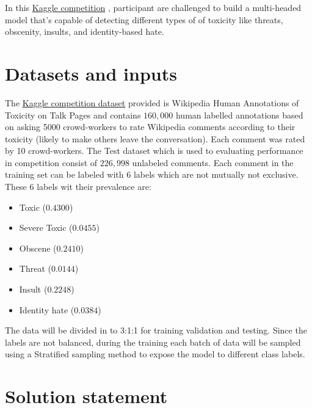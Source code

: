 \documentclass{article}
\begin{document}
In this \href{https://www.kaggle.com/c/jigsaw-toxic-comment-classification-challenge}{Kaggle competition} ,  participant are challenged to build a multi-headed model that’s
capable of detecting different types of of toxicity like threats, obscenity,
insults, and identity-based hate.


\section{Datasets and inputs}

The \href{https://www.kaggle.com/c/jigsaw-toxic-comment-classification-challenge/data}{Kaggle competition dataset} provided is Wikipedia Human Annotations of Toxicity on Talk Pages and contains $160,000$ human labelled annotations based on asking 5000 crowd-workers to rate Wikipedia comments according to their toxicity (likely to make others leave the conversation). Each comment was rated by 10 crowd-workers. The Test dataset which is used to evaluating performance in competition consist of $226,998$ unlabeled comments. Each comment in the training set can be labeled with $6$ labels which are not mutually not exclusive. These 6 labels wit their prevalence are:

\begin{itemize}
        \item Toxic ($0.4300$)
        \item Severe Toxic ($0.0455$)
        \item Obscene ($0.2410$)
        \item Threat ($0.0144$)
        \item Insult ($0.2248$)
        \item Identity hate ($0.0384$)
\end{itemize}


The data will be divided in to 3:1:1 for training validation and testing. Since the labels are not balanced, during the training each batch of data will be sampled using a Stratified sampling method to expose the model to different class labels.





\section{Solution statement}
\end{document}
